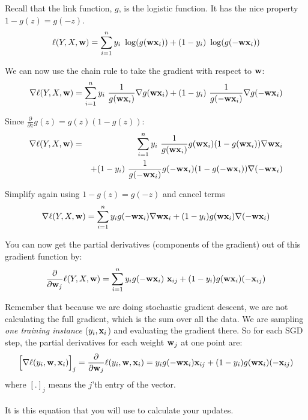 \documentclass[11pt]{article}
\newcommand{\vw}{{\bf w}}
\newcommand{\vx}{{\bf x}}
\newcommand{\vxi}{{\bf x}_i}
\newcommand{\vxij}{{\bf x}_{ij}}
\begin{document}
Recall that the link function, $g$, is the logistic function. It has the nice property $1 - g(z) = g(-z)$.
\begin{equation}
\ell(Y,X,\vw) = \sum_{i=1}^n{ y_i\ \log( g(\vw \vxi) ) + (1-y_i)\ \log( g(-\vw \vxi) )}
\end{equation}

We can now use the chain rule to take the gradient with respect to $\vw$:
\begin{equation}
\nabla \ell(Y,X,\vw) = \sum_{i=1}^n{
	y_i\ \frac{1}{g(\vw \vxi)} \nabla g(\vw \vxi)
	+ (1-y_i)\ \frac{1}{g(-\vw \vxi)} \nabla g(-\vw \vxi)
}
\end{equation}

Since $\frac{\partial}{\partial z}g(z) = g(z)(1-g(z))$:
\begin{eqnarray}
\nabla \ell(Y,X,\vw) &=& \sum_{i=1}^n
	 y_i\ \frac{1}{g(\vw \vxi)} g(\vw \vxi) (1-g(\vw \vxi)) \nabla \vw \vxi \\
& & 	+ (1-y_i)\ \frac{1}{g(-\vw \vxi)} g(-\vw \vxi) (1-g(-\vw \vxi)) \nabla (-\vw \vxi)
\end{eqnarray}

Simplify again using $1-g(z) = g(-z)$ and cancel terms
\begin{equation}
\nabla \ell(Y,X,\vw) = \sum_{i=1}^n{
	y_i g(-\vw \vxi) \nabla \vw \vxi
	+ (1-y_i) g(\vw \vxi) \nabla (-\vw \vxi)
}
\end{equation}

You can now get the partial derivatives (components of the gradient) out of this gradient function by:
\begin{equation}
\frac{\partial}{\partial \vw_j} \ell(Y,X,\vw) = \sum_{i=1}^n{
	y_i g(-\vw \vxi) \ \vxij
	+ (1-y_i) g(\vw \vxi) (-\vxij)
}
\end{equation}

Remember that because we are doing stochastic gradient descent, we are not calculating the full gradient, which is the sum over all the data. We are sampling \emph{one training instance} ($y_i, \vx_i$) and evaluating the gradient there. So for each SGD step, the partial derivatives for each weight $\vw_j$ at one point are:
\begin{equation}
\Big[ \nabla \ell(y_i, \vw, \vxi) \Big]_j = \frac{\partial}{\partial \vw_j} \ell(y_i, \vw, \vxi) =
	y_i g(-\vw \vxi) \vxij + (1-y_i) g(\vw \vxi) (-\vxij)
\end{equation}
where $[.]_j$ means the $j$'th entry of the vector.
\\
\\
It is this equation that you will use to calculate your updates.
\end{document}
